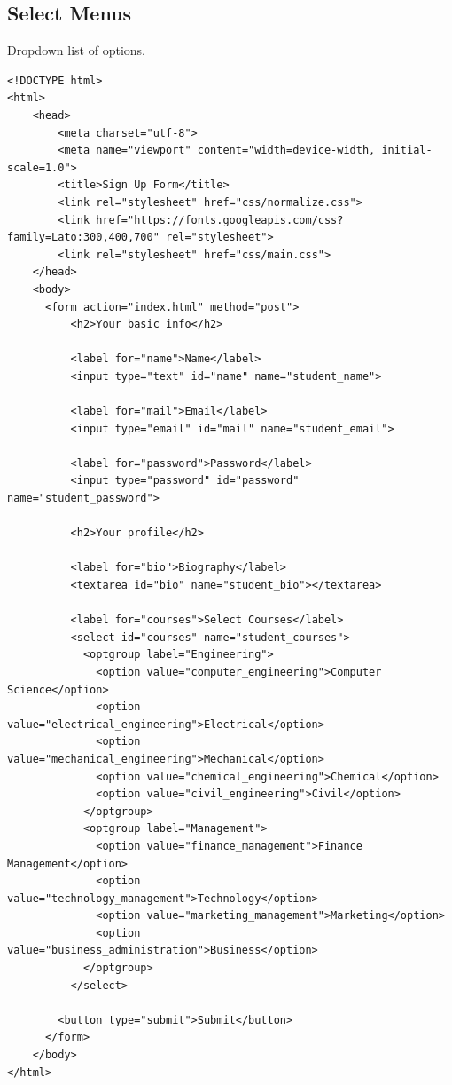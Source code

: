 \documentclass[12pt,a4paper]{article}
\begin{document}
\subsection*{Select Menus}
Dropdown list of options.
\begin{verbatim}
<!DOCTYPE html>
<html>
    <head>
        <meta charset="utf-8">
        <meta name="viewport" content="width=device-width, initial-scale=1.0">
        <title>Sign Up Form</title>
        <link rel="stylesheet" href="css/normalize.css">
        <link href="https://fonts.googleapis.com/css?family=Lato:300,400,700" rel="stylesheet">
        <link rel="stylesheet" href="css/main.css">
    </head>
    <body>
      <form action="index.html" method="post">
          <h2>Your basic info</h2>

          <label for="name">Name</label>
          <input type="text" id="name" name="student_name">

          <label for="mail">Email</label>
          <input type="email" id="mail" name="student_email">

          <label for="password">Password</label>
          <input type="password" id="password" name="student_password">

          <h2>Your profile</h2>

          <label for="bio">Biography</label>
          <textarea id="bio" name="student_bio"></textarea>

          <label for="courses">Select Courses</label>
          <select id="courses" name="student_courses">
            <optgroup label="Engineering">
              <option value="computer_engineering">Computer Science</option>
              <option value="electrical_engineering">Electrical</option>
              <option value="mechanical_engineering">Mechanical</option> 
              <option value="chemical_engineering">Chemical</option>
              <option value="civil_engineering">Civil</option>
            </optgroup>
            <optgroup label="Management">
              <option value="finance_management">Finance Management</option>
              <option value="technology_management">Technology</option>
              <option value="marketing_management">Marketing</option>
              <option value="business_administration">Business</option>     
            </optgroup>
          </select>

        <button type="submit">Submit</button>
      </form>
    </body>
</html>
\end{verbatim}
\end{document}
